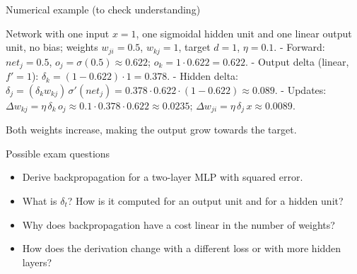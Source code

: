 \begin{boxexample}{Numerical example (to check understanding)}

Network with one input \(x = 1\), one sigmoidal hidden unit and one
linear output unit, no bias; weights \(w_{ji} = 0.5\), \(w_{kj} = 1\),
target \(d = 1\), \(\eta = 0.1\). - Forward: \(net_j = 0.5\),
\(o_j = \sigma(0.5) \approx 0.622\);
\(o_k = 1 \cdot 0.622 = 0.622\). - Output delta (linear,
\(f' = 1\)): \(\delta_k = (1 - 0.622)\cdot 1 = 0.378\). - Hidden
delta:
\(\delta_j = (\delta_k w_{kj})\,\sigma'(net_j) = 0.378 \cdot 0.622 \cdot (1 - 0.622) \approx 0.089\).
- Updates:
\(\Delta w_{kj} = \eta\,\delta_k\,o_j \approx 0.1 \cdot 0.378 \cdot 0.622 \approx 0.0235\);
\(\Delta w_{ji} = \eta\,\delta_j\,x \approx 0.0089\).

Both weights increase, making the output grow towards the target.

\end{boxexample}

\begin{boxquestion}{Possible exam questions}

\begin{itemize}
\tightlist
\item
  Derive backpropagation for a two-layer MLP with squared error.
\item
  What is \(\delta_t\)? How is it computed for an output unit and for
  a hidden unit?
\item
  Why does backpropagation have a cost linear in the number of
  weights?
\item
  How does the derivation change with a different loss or with more
  hidden layers?
\end{itemize}

\end{boxquestion}
